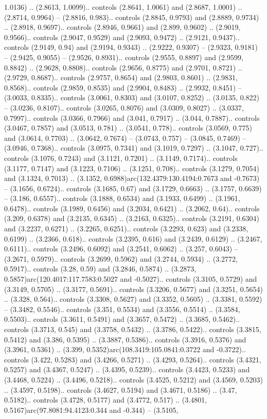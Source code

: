 1.0136) .. (2.8613, 1.0099).. controls (2.8641, 1.0061) and (2.8687, 1.0001) .. (2.8714, 0.9964) -- (2.8816, 0.983).. controls (2.8845, 0.9793) and (2.8889, 0.9734) .. (2.8918, 0.9697).. controls (2.8946, 0.9661) and (2.899, 0.9602) .. (2.9019, 0.9566).. controls (2.9047, 0.9529) and (2.9093, 0.9472) .. (2.9121, 0.9437).. controls (2.9149, 0.94) and (2.9194, 0.9343) .. (2.9222, 0.9307) -- (2.9323, 0.9181) -- (2.9425, 0.9055) -- (2.9526, 0.8931).. controls (2.9555, 0.8897) and (2.9599, 0.8842) .. (2.9628, 0.8808).. controls (2.9656, 0.8775) and (2.9701, 0.8721) .. (2.9729, 0.8687).. controls (2.9757, 0.8654) and (2.9803, 0.8601) .. (2.9831, 0.8568).. controls (2.9859, 0.8535) and (2.9904, 0.8483) .. (2.9932, 0.8451) -- (3.0033, 0.8335).. controls (3.0061, 0.8303) and (3.0107, 0.8252) .. (3.0135, 0.822) -- (3.0236, 0.8107).. controls (3.0265, 0.8076) and (3.0309, 0.8027) .. (3.0337, 0.7997).. controls (3.0366, 0.7966) and (3.041, 0.7917) .. (3.044, 0.7887).. controls (3.0467, 0.7857) and (3.0513, 0.781) .. (3.0541, 0.778).. controls (3.0569, 0.775) and (3.0614, 0.7703) .. (3.0642, 0.7674) -- (3.0743, 0.757) -- (3.0845, 0.7469) -- (3.0946, 0.7368).. controls (3.0975, 0.7341) and (3.1019, 0.7297) .. (3.1047, 0.727).. controls (3.1076, 0.7243) and (3.1121, 0.7201) .. (3.1149, 0.7174).. controls (3.1177, 0.7147) and (3.1223, 0.7106) .. (3.1251, 0.708).. controls (3.1279, 0.7054) and (3.1324, 0.7013) .. (3.1352, 0.6988)arc(132.4379:130.4194:0.7673 and -0.7673) -- (3.1656, 0.6724).. controls (3.1685, 0.67) and (3.1729, 0.6663) .. (3.1757, 0.6639) -- (3.186, 0.6557).. controls (3.1888, 0.6534) and (3.1933, 0.6499) .. (3.1961, 0.6478).. controls (3.1989, 0.6456) and (3.2034, 0.6421) .. (3.2062, 0.64).. controls (3.209, 0.6378) and (3.2135, 0.6345) .. (3.2163, 0.6325).. controls (3.2191, 0.6304) and (3.2237, 0.6271) .. (3.2265, 0.6251).. controls (3.2293, 0.623) and (3.2338, 0.6199) .. (3.2366, 0.618).. controls (3.2395, 0.616) and (3.2439, 0.6129) .. (3.2467, 0.6111).. controls (3.2496, 0.6092) and (3.2541, 0.6062) .. (3.257, 0.6043) -- (3.2671, 0.5979).. controls (3.2699, 0.5962) and (3.2744, 0.5934) .. (3.2772, 0.5917).. controls (3.28, 0.59) and (3.2846, 0.5874) .. (3.2873, 0.5857)arc(120.4017:117.7583:0.5027 and -0.5027).. controls (3.3105, 0.5729) and (3.3149, 0.5705) .. (3.3177, 0.5691).. controls (3.3206, 0.5677) and (3.3251, 0.5654) .. (3.328, 0.564).. controls (3.3308, 0.5627) and (3.3352, 0.5605) .. (3.3381, 0.5592) -- (3.3482, 0.5546).. controls (3.351, 0.5534) and (3.3556, 0.5514) .. (3.3584, 0.5503).. controls (3.3611, 0.5491) and (3.3657, 0.5472) .. (3.3685, 0.5462).. controls (3.3713, 0.545) and (3.3758, 0.5432) .. (3.3786, 0.5422).. controls (3.3815, 0.5412) and (3.386, 0.5395) .. (3.3887, 0.5386).. controls (3.3916, 0.5376) and (3.3961, 0.5361) .. (3.399, 0.5352)arc(108.3419:105.0841:0.3722 and -0.3722).. controls (3.422, 0.5283) and (3.4266, 0.5271) .. (3.4293, 0.5264).. controls (3.4321, 0.5257) and (3.4367, 0.5247) .. (3.4395, 0.5239).. controls (3.4423, 0.5233) and (3.4468, 0.5224) .. (3.4496, 0.5218).. controls (3.4525, 0.5212) and (3.4569, 0.5203) .. (3.4597, 0.5198).. controls (3.4627, 0.5194) and (3.4671, 0.5186) .. (3.47, 0.5182).. controls (3.4728, 0.5177) and (3.4772, 0.517) .. (3.4801, 0.5167)arc(97.8081:94.4123:0.344 and -0.344) -- (3.5105, 